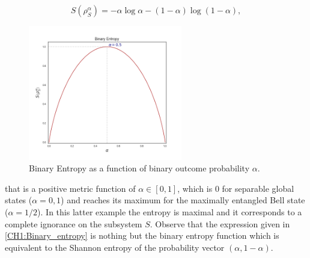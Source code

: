 \begin{equation}
S\left(\rho_{S}^{\alpha}\right)=-\alpha \log \alpha-(1-\alpha) \log (1-\alpha),
\label{CH1:Binary_entropy}
\end{equation}
\begin{figure}[h!]
\centering
\includegraphics[width=0.6\textwidth]{Figures/Binary_entropy.png}
\caption{Binary Entropy  as a function of binary outcome probability $\alpha$.}
\end{figure}
that is a positive metric function of $\alpha\in [0,1]$, which is 0 for separable global states ($\alpha=0,1$) and reaches its maximum for the maximally entangled Bell state ($\alpha=1/2$). In this latter example the entropy is maximal and it corresponds to a complete ignorance on the subsystem $S$. Observe that the expression given in \eqref{CH1:Binary_entropy} is nothing but the binary entropy function \cite{mackay_information_2003} which is equivalent to the Shannon entropy \cite{shannon_mathematical_1948} of the probability vector $(\alpha,1-\alpha)$.

